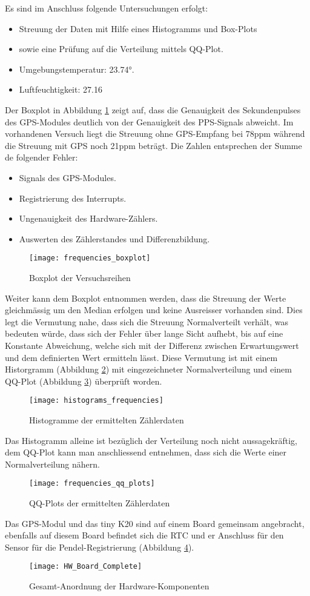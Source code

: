 Es sind im Anschluss folgende Untersuchungen erfolgt:
\begin{itemize}
	\item Streuung der Daten mit Hilfe eines Histogramms und Box-Plots
	\item sowie eine Prüfung auf die Verteilung mittels QQ-Plot.
	\item Umgebungstemperatur: 23.74°.
	\item Luftfeuchtigkeit: 27.16%
\end{itemize}
Der Boxplot in Abbildung \ref{fig:freq_boxplot} zeigt auf, dass die Genauigkeit des Sekundenpulses des GPS-Modules deutlich von der Genauigkeit des PPS-Signals abweicht. Im vorhandenen Versuch liegt die Streuung ohne GPS-Empfang bei 78ppm während die Streuung mit GPS noch 21ppm beträgt. Die Zahlen entsprechen der Summe de folgender Fehler:
\begin{itemize}
	\item Signals des GPS-Modules.
	\item Registrierung des Interrupts.
	\item Ungenauigkeit des Hardware-Zählers.
	\item Auswerten des Zählerstandes und Differenzbildung. 
\end{itemize}
	\begin{figure}[H]
		\centering
		\texttt{[image: frequencies\_boxplot]}
		\caption{Boxplot der Versuchsreihen}
		\label{fig:freq_boxplot}
	\end{figure}
%
Weiter kann dem Boxplot entnommen werden, dass die Streuung der Werte gleichmässig um den Median erfolgen und keine Ausreisser vorhanden sind. Dies legt die Vermutung nahe, dass sich die Streuung Normalverteilt verhält, was bedeuten würde, dass sich der Fehler über lange Sicht aufhebt, bis auf eine Konstante Abweichung, welche sich mit der Differenz zwischen Erwartungswert und dem definierten Wert ermitteln lässt. Diese Vermutung ist mit einem Historgramm (Abbildung \ref{fig:freq_histograms}) mit eingezeichneter Normalverteilung und einem QQ-Plot (Abbildung \ref{fig:freq_qq_plot}) überprüft worden.
	\begin{figure}[H]
		\centering
		\texttt{[image: histograms\_frequencies]}
		\caption{Histogramme der ermittelten Zählerdaten}
		\label{fig:freq_histograms}
	\end{figure}
	Das Histogramm alleine ist bezüglich der Verteilung noch nicht aussagekräftig, dem QQ-Plot kann man anschliessend entnehmen, dass sich die Werte einer Normalverteilung nähern.
	\begin{figure}[H]
		\centering
		\texttt{[image: frequencies\_qq\_plots]}
		\caption{QQ-Plots der ermittelten Zählerdaten}
		\label{fig:freq_qq_plot}
	\end{figure}
Das GPS-Modul und das tiny K20 sind auf einem Board gemeinsam angebracht, ebenfalls auf diesem Board befindet sich die RTC und er Anschluss für den Sensor für die Pendel-Registrierung (Abbildung \ref{fig:hardware_board}).
	\begin{figure}[H]
		\centering
		\texttt{[image: HW\_Board\_Complete]}
		\caption{Gesamt-Anordnung der Hardware-Komponenten}
		\label{fig:hardware_board}
	\end{figure}